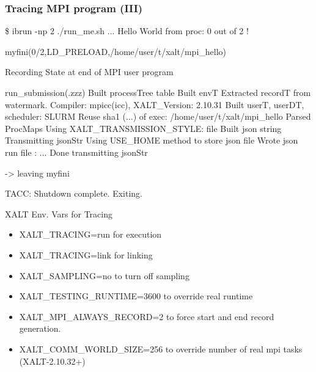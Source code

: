 \documentclass{beamer}
\begin{document}
\begin{frame}[fragile]
    \frametitle{Tracing MPI program (III)}
 {\tiny
    \begin{semiverbatim}
\$ ibrun -np 2 ./run\_me.sh
...
Hello World from proc: 0 out of 2 !

myfini(0/2,LD\_PRELOAD,/home/user/t/xalt/mpi\_hello){
  Recording State at end of MPI user program

  run\_submission(.zzz) {
    Built processTree table
    Built envT
    Extracted recordT from watermark. Compiler: mpicc(icc), XALT\_Version: 2.10.31
    Built userT, userDT, scheduler: SLURM
    Reuse   sha1 (...) of exec: /home/user/t/xalt/mpi\_hello
    Parsed ProcMaps
    Using XALT\_TRANSMISSION\_STYLE: file
    Built json string
    Transmitting jsonStr
    Using USE\_HOME method to store json file
    Wrote json run file : ...
    Done transmitting jsonStr
  }

    -> leaving myfini
}

TACC:  Shutdown complete. Exiting. 
\end{semiverbatim}
}
\end{frame}


\begin{frame}{XALT Env. Vars for Tracing}
  \begin{itemize}
    \item XALT\_TRACING=run for execution
    \item XALT\_TRACING=link for linking
    \item XALT\_SAMPLING=no to turn off sampling
    \item XALT\_TESTING\_RUNTIME=3600 to override real runtime
    \item XALT\_MPI\_ALWAYS\_RECORD=2 to force start and end record generation.
    \item XALT\_COMM\_WORLD\_SIZE=256 to override number of real mpi tasks
      (XALT-2.10.32+)
  \end{itemize}
\end{frame}

%
%

%
\end{document}
